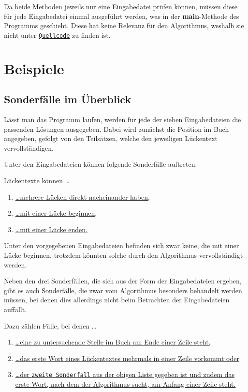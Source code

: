 \documentclass[a4paper, 10pt, ngerman]{scrartcl}
\begin{document}
Da beide Methoden jeweils nur eine Eingabedatei prüfen können,
müssen diese für jede Eingabedatei einmal ausgeführt werden,
was in der \textbf{main}-Methode des Programms geschieht.
Diese hat keine Relevanz für den Algorithmus,
weshalb sie nicht unter \hyperref[sec:quellcode]{\texttt{Quellcode}} zu finden ist.


\section{Beispiele}\label{sec:beispiele}
\subsection{Sonderfälle im Überblick}\label{ueberblickSondefaelle}
Lässt man das Programm laufen,
werden für jede der sieben Eingabedateien die passenden Lösungen ausgegeben.
Dabei wird zunächst die Position im Buch angegeben,
gefolgt von den Teilsätzen,
welche den jeweiligen Lückentext vervollständigen.

Unter den Eingabedateien können folgende Sonderfälle auftreten:

Lückentexte können \ldots

\begin{enumerate}
	\item \hyperref[sec:ersterSonderfall]{\ldots mehrere Lücken direkt nacheinander haben,}\label{sonderfallEins}
	\item \hyperref[sec:zweiterSonderfall]{\ldots mit einer Lücke beginnen},\label{sonderfallZwei}
	\item \hyperref[sec:dritterSonderfall]{\ldots mit einer Lücke enden.}\label{sonderfallDrei}
    \setcounter{enumTemp}{\theenumi}
\end{enumerate}

Unter den vorgegebenen Eingabedateien befinden sich zwar keine,
die mit einer Lücke beginnen,
trotzdem könnten solche durch den Algorithmus vervollständigt werden.

Neben den drei Sonderfällen,
die sich aus der Form der Eingabedateien ergeben,
gibt es auch Sonderfälle,
die zwar vom Algorithmus besonders behandelt werden müssen,
bei denen dies allerdings nicht beim Betrachten der Eingabedateien auffällt.

Dazu zählen Fälle,
bei denen \ldots

\begin{enumerate}
	\setcounter{enumi}{\theenumTemp}
	\item \hyperref[sec:vierterSonderfall]{\ldots eine zu untersuchende Stelle im Buch am Ende einer Zeile steht,}\label{sonderfallVier}
	\item \hyperref[sec:fuenfterSonderfall]{\ldots das erste Wort eines Lückentextes mehrmals in einer Zeile vorkommt oder}\label{sonderfallFuenf}
	\item \hyperref[sec:sechsterSonderfall]{\ldots der \hyperref[sonderfallZwei]{\texttt{zweite Sonderfall}} aus der obigen Liste gegeben ist
	und zudem das erste Wort,
	nach dem der Algorithmus sucht,
	am Anfang einer Zeile steht.}\label{sonderfallSechs}
\end{enumerate}
\end{document}
